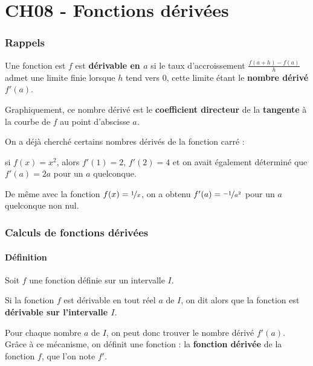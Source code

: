 \documentclass[a4paper,11pt]{article}
\author{Pierquet}
\title{\nomfichier}
\begin{document}
\pagestyle{fancy}

\part{CH08 - Fonctions dérivées}

\section{Rappels}

\begin{cprop}[ - Rappel]
Une fonction est $f$ est \textbf{dérivable en $a$} si le taux d'accroissement $\frac{f(a+h)-f(a)}{h}$ admet une limite finie lorsque $h$ tend vers 0, cette limite étant le \textbf{nombre dérivé} $f'(a)$.

Graphiquement, ce nombre dérivé est le \textbf{coefficient directeur} de la \textbf{tangente} à la courbe de $f$ au point d'abscisse $a$.
\end{cprop}

\begin{cexemple}
On a déjà cherché certains nombres dérivés de la fonction carré :

\tabula{}si $f(x)=x^2$, alors $f'(1)=2$, $f'(2)=4$ et on avait également déterminé que $f'(a)=2a$ pour un $a$ quelconque.

De même avec la fonction $f(x)=\nicefrac{1}{x}$, on a obtenu $f'(a)=\nicefrac{-1}{a^2}$ pour un $a$ quelconque non nul.
\end{cexemple}

\section{Calculs de fonctions dérivées}

\subsection{Définition}

\begin{cdefi}
Soit $f$ une fonction définie sur un intervalle $I$.

Si la fonction $f$ est dérivable en tout réel $a$ de $I$, on dit alors que la fonction est \textbf{dérivable sur l'intervalle $I$}.

Pour chaque nombre $a$ de $I$, on peut donc trouver le nombre dérivé $f'(a)$. Grâce à ce mécanisme, on définit une fonction : la \textbf{fonction dérivée} de la fonction $f$, que l'on note $f'$.
\end{cdefi}
\end{document}
